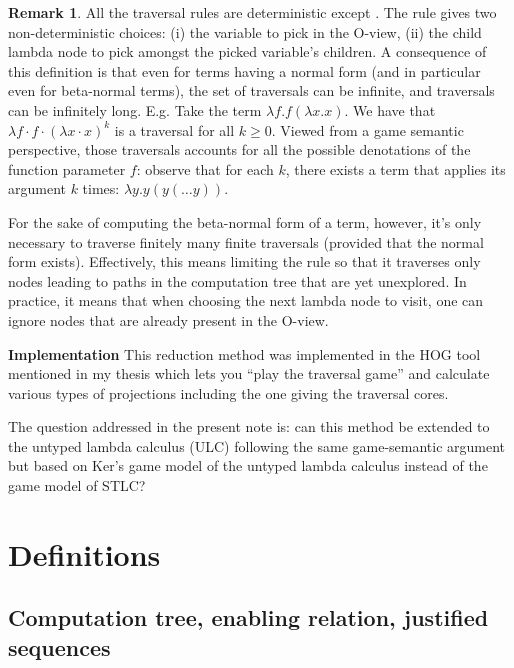\documentclass{article}
\theoremstyle{definition}
\newtheorem{remark}{Remark}[section]
\begin{document}
\begin{remark}
All the traversal rules are deterministic except . The rule  gives two non-deterministic choices: (i) the variable to pick in the O-view,
(ii) the child lambda node to pick amongst the picked variable's children.
A consequence of this definition is that even for terms having a normal form (and in particular even for beta-normal terms), the set of traversals can be infinite, and traversals can be infinitely long.
E.g. Take the term $\lambda f . f (\lambda x. x)$. We have that $\lambda f \cdot f \cdot (\lambda x \cdot  x)^k$ is a traversal for all $k\geq0$. Viewed from a game semantic perspective, those traversals accounts for all the possible denotations of the function parameter $f$: observe that for each $k$, there exists a term that applies its argument $k$ times: $\lambda y . y (y ( \ldots y)) $.

For the sake of computing the beta-normal form of a term, however, it's only necessary to traverse finitely many finite traversals (provided that the normal form exists). Effectively, this means limiting the rule  so that it traverses only nodes leading to paths in the computation tree that are yet unexplored. In practice, it means that when choosing the next lambda node to visit, one can ignore nodes that are already present in the O-view.
\end{remark}

\textbf{Implementation}
This reduction method was implemented in the HOG tool mentioned in my thesis which lets you ``play the traversal game'' and calculate various types of projections including the one giving the traversal cores.

The question addressed in the present note is: can this method be extended to the untyped lambda calculus (ULC) following the same game-semantic argument but based on Ker's game model of the untyped lambda calculus instead of the game model of STLC?


\section{Definitions}

\subsection{Computation tree, enabling relation, justified sequences}
\end{document}
